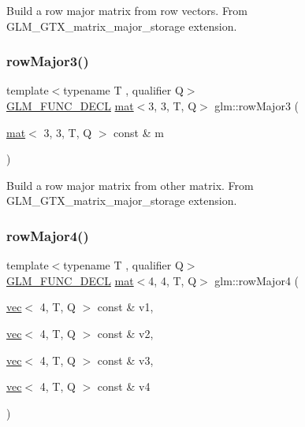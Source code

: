Build a row major matrix from row vectors. From G\+L\+M\+\_\+\+G\+T\+X\+\_\+matrix\+\_\+major\+\_\+storage extension. \mbox{\label{group__gtx__matrix__major__storage_gad8a3a50ab47bbe8d36cdb81d90dfcf77}} 
\subsubsection{\texorpdfstring{row\+Major3()}{rowMajor3()}\hspace{0.1cm}{\footnotesize\ttfamily [2/2]}}
{\footnotesize\ttfamily template$<$typename T , qualifier Q$>$ \\
\mbox{\hyperlink{setup_8hpp_ab2d052de21a70539923e9bcbf6e83a51}{G\+L\+M\+\_\+\+F\+U\+N\+C\+\_\+\+D\+E\+CL}} \mbox{\hyperlink{structglm_1_1mat}{mat}}$<$3, 3, T, Q$>$ glm\+::row\+Major3 (\begin{DoxyParamCaption}\item[{\mbox{\hyperlink{structglm_1_1mat}{mat}}$<$ 3, 3, T, Q $>$ const \&}]{m }\end{DoxyParamCaption})}

Build a row major matrix from other matrix. From G\+L\+M\+\_\+\+G\+T\+X\+\_\+matrix\+\_\+major\+\_\+storage extension. \mbox{\label{group__gtx__matrix__major__storage_ga9636cd6bbe2c32a8d0c03ffb8b1ef284}} 
\subsubsection{\texorpdfstring{row\+Major4()}{rowMajor4()}\hspace{0.1cm}{\footnotesize\ttfamily [1/2]}}
{\footnotesize\ttfamily template$<$typename T , qualifier Q$>$ \\
\mbox{\hyperlink{setup_8hpp_ab2d052de21a70539923e9bcbf6e83a51}{G\+L\+M\+\_\+\+F\+U\+N\+C\+\_\+\+D\+E\+CL}} \mbox{\hyperlink{structglm_1_1mat}{mat}}$<$4, 4, T, Q$>$ glm\+::row\+Major4 (\begin{DoxyParamCaption}\item[{\mbox{\hyperlink{structglm_1_1vec}{vec}}$<$ 4, T, Q $>$ const \&}]{v1,  }\item[{\mbox{\hyperlink{structglm_1_1vec}{vec}}$<$ 4, T, Q $>$ const \&}]{v2,  }\item[{\mbox{\hyperlink{structglm_1_1vec}{vec}}$<$ 4, T, Q $>$ const \&}]{v3,  }\item[{\mbox{\hyperlink{structglm_1_1vec}{vec}}$<$ 4, T, Q $>$ const \&}]{v4 }\end{DoxyParamCaption})}

